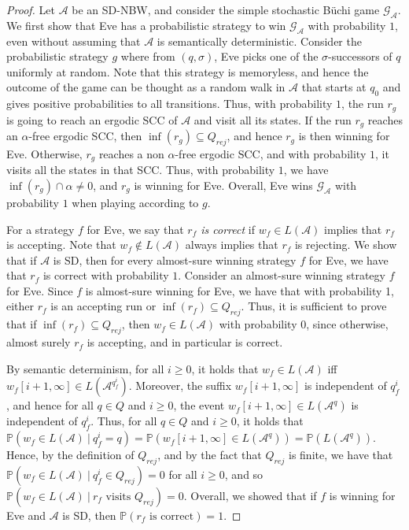 \documentclass[10pt,a4paper]{amsart}
\theoremstyle{definition}
\numberwithin{equation}{section}
\newcommand{\buchi}{B\"uchi\xspace}
\newcommand{\A}{{\mathcal A}}
\newcommand{\G}{{\mathcal G}}
\renewcommand{\P}{\mathbb{P}}
\begin{document}
\begin{proof}
Let $\A$ be an SD-NBW, and consider the simple stochastic \buchi game  $\mathcal{G}_\A$.
We first show that Eve has a probabilistic strategy to win $\G_\A$ with probability $1$, even without assuming that $\A$ is semantically deterministic. Consider the probabilistic strategy $g$ where from $(q,\sigma)$, Eve picks one of the $\sigma$-successors of $q$ uniformly at random. Note that this strategy is memoryless, and hence the outcome of the game can be thought as a random walk in $\A$ that starts at $q_0$ and gives positive probabilities to all transitions. Thus, with probability $1$, the run $r_g$ is going to reach an ergodic SCC of $\A$ and visit all its states.  If the run $r_g$ reaches an $\alpha$-free ergodic SCC, then $\inf(r_g)\subseteq Q_{rej}$, and hence $r_g$ is then winning for Eve. Otherwise, $r_g$ reaches a non $\alpha$-free ergodic SCC, and with probability $1$, it visits  all the states in that SCC. Thus, with probability $1$, we have $\inf(r_g)\cap \alpha\neq 0$, and $r_g$ is winning for Eve. Overall, Eve wins $\G_\A$ with probability $1$ when playing according to $g$.

For a strategy $f$ for Eve, we say that {\em $r_f$ is correct} if $w_f\in L(\A)$ implies that $r_f$ is accepting. Note that $w_f\notin L(\A)$ always implies that $r_f$ is rejecting. We show that if $\A$ is SD, then for every almost-sure winning strategy $f$ for Eve, we have that $r_f$ is correct with probability $1$. 
Consider an almost-sure winning strategy $f$ for Eve. Since $f$ is almost-sure winning for Eve, we have that with probability 1, either $r_f$ is an accepting run or $\inf(r_f)\subseteq Q_{rej}$. Thus, it is sufficient to prove that if $\inf(r_f)\subseteq Q_{rej}$, then $w_f\in L(\A)$ with probability $0$, since otherwise, almost surely $r_f$ is accepting, and in particular is correct. 

By semantic determinism, for all $i\geq 0$, it holds that $w_f\in L(\A)$ iff $w_f[i+1,\infty]\in L(\A^{q_f^i})$. Moreover, the 
suffix $w_f[i+1,\infty]$ is independent of $q^i_f$, and hence for all $q\in Q$ and $i\geq 0$, the event $w_f[i+1,\infty]\in L(\A^{q})$ is independent of $q^i_f$.
Thus, for all $q\in Q$ and $i\geq 0$, it holds that $\P(w_f\in L(\A)\: | \: q_f^i=q)=\P(w_f[i+1,\infty]\in L(\A^q))=\P(L(\A^q))$. Hence, by the definition of $Q_{rej}$, and by the fact that $Q_{rej}$ is finite, we have that $\P(w_f\in L(\A)\: | \: q_f^i\in Q_{rej})=0$ for all $i\geq 0$, and so $\P(w_f\in L(\A)\: | \: r_f\text{ visits }Q_{rej})=0$. Overall, we showed that if $f$ is winning for Eve and $\A$ is SD, then $\P(r_f\text{ is correct})=1$.


\end{proof}
\end{document}
